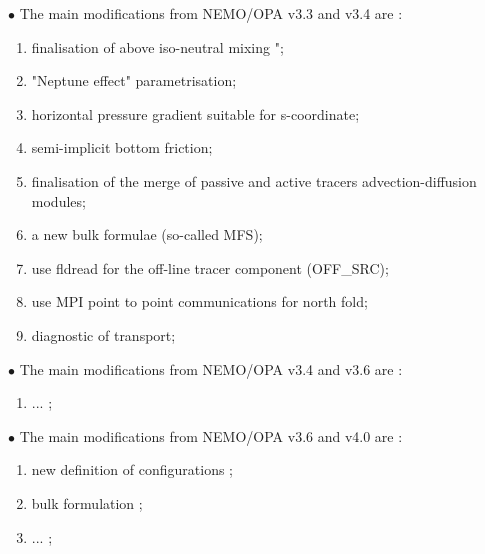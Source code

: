 \documentclass[../tex_main/NEMO_manual]{subfiles}
\begin{document}
\vspace{1cm}
$\bullet$ The main modifications from NEMO/OPA v3.3 and  v3.4 are :\\
\begin{enumerate}
\item finalisation of above iso-neutral mixing \citep{Griffies_al_JPO98}";
\item "Neptune effect" parametrisation;
\item horizontal pressure gradient suitable for s-coordinate;
\item semi-implicit bottom friction;
\item finalisation of the merge of passive and active tracers advection-diffusion modules;
\item a new bulk formulae (so-called MFS);
\item use fldread for the off-line tracer component (OFF\_SRC);
\item use MPI point to point communications  for north fold;
\item diagnostic of transport;
\end{enumerate}


 \vspace{1cm}
$\bullet$ The main modifications from NEMO/OPA v3.4 and  v3.6 are :\\
\begin{enumerate}
 \item ... ; 
\end{enumerate}


 \vspace{1cm}
$\bullet$ The main modifications from NEMO/OPA v3.6 and  v4.0 are :\\
\begin{enumerate}
\item new definition of configurations ;
\item bulk formulation ;
\item ... ; 
\end{enumerate}
\end{document}
